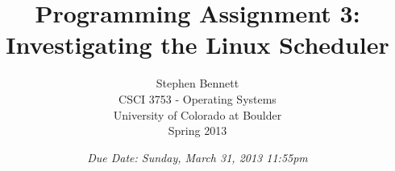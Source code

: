 \documentclass[12pt]{article}
\title{Programming Assignment 3:\\Investigating the Linux Scheduler}
\author{
  Stephen Bennett\\
  CSCI 3753 - Operating Systems\\
  University of Colorado at Boulder\\
  Spring 2013\\
}
\date{\emph{Due Date: Sunday, March 31, 2013 11:55pm}}
\begin{document}
\maketitle

\clearpage
\vspace*{\fill}

\vspace*{\fill}

\clearpage










\clearpage


\appendix

\clearpage


\clearpage

\end{document}
